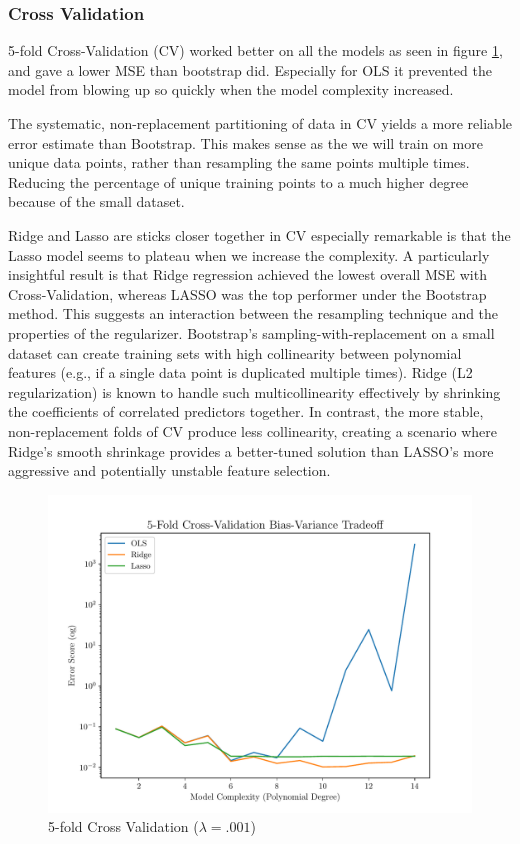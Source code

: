 \documentclass[twocolumn,aps]{revtex4}
\begin{document}
\subsubsection{Cross Validation}
5-fold Cross-Validation (CV) worked better on all the models as seen in figure \ref{fig:CrossValidation}, and gave a lower MSE than bootstrap did.
Especially for OLS it prevented the model from blowing up so quickly when the model complexity increased.

The systematic, non-replacement partitioning of data in CV yields a more reliable error estimate than Bootstrap.
This makes sense as the we will train on more unique data points, rather than resampling the same points multiple times.
Reducing the percentage of unique training points to a much higher degree because of the small dataset.

Ridge and Lasso are sticks closer together in CV especially remarkable is that the Lasso model seems to plateau when we increase the complexity.
A particularly insightful result is that Ridge regression achieved the lowest overall MSE with Cross-Validation, whereas LASSO was the top performer under the Bootstrap method. 
This suggests an interaction between the resampling technique and the properties of the regularizer. 
Bootstrap's sampling-with-replacement on a small dataset can create training sets with high collinearity between polynomial features (e.g., if a single data point is duplicated multiple times). 
Ridge (L2 regularization) is known to handle such multicollinearity effectively by shrinking the coefficients of correlated predictors together. 
In contrast, the more stable, non-replacement folds of CV produce less collinearity, creating a scenario where Ridge's smooth shrinkage provides a better-tuned solution than LASSO's more aggressive and potentially unstable feature selection.


\begin{figure}[h]
    \centering
    \includegraphics[width=.95 \linewidth]{Figures/Cross_Validation.pdf}
    \caption{5-fold Cross Validation ($\lambda=.001$)}
    \label{fig:CrossValidation}
\end{figure}
\end{document}
